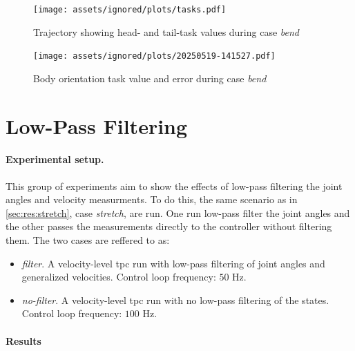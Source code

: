 \begin{figure}[!ht]
    \centering
    \texttt{[image: assets/ignored/plots/tasks.pdf]}
    \caption{Trajectory showing head- and tail-task values during case \textit{bend}}
    \label{fig:results:tpc:bend:task-traj}
\end{figure}
\begin{figure}[!ht]
    \centering
    \texttt{[image: assets/ignored/plots/20250519-141527.pdf]}
    \caption{Body orientation task value and error during case \textit{bend}}
    \label{fig:results:tpc:bend:dp-tracking}
\end{figure}

\FloatBarrier


\newpage
\section{Low-Pass Filtering}
\label{sec:results:lowpass_filtering}

\paragraph{Experimental setup.}
This group of experiments aim to show the effects of low-pass filtering the
joint angles and velocity measurments. To do this, the same scenario as in \autoref{sec:res:stretch}, case \textit{stretch},
are run. One run low-pass filter the joint angles and the other passes the measurements
directly to the controller without filtering them. The two cases are reffered to as:
\begin{itemize}
    \item \textit{filter}. A velocity-level \gls{tpc} run with low-pass filtering of joint angles and generalized velocities.
        Control loop frequency: \(50\) Hz.
    \item \textit{no-filter}. A velocity-level \gls{tpc} run with no low-pass filtering of the states.
        Control loop frequency: \(100\) Hz.
\end{itemize}

\paragraph{Results}

